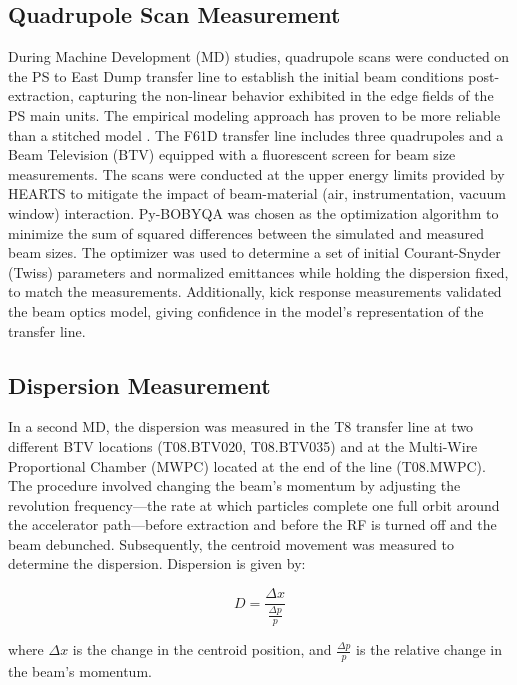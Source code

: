 \documentclass[a4paper,
               biblatex,     %
               ]{jacow}
\begin{document}
\subsection{Quadrupole Scan Measurement}

During Machine Development (MD) studies, quadrupole scans were conducted on the PS to East Dump transfer line to establish the initial beam conditions post-extraction, capturing the non-linear behavior exhibited in the edge fields of the PS main units. The empirical modeling approach has proven to be more reliable than a stitched model \cite{johnson_beam_2022}. The F61D transfer line includes three quadrupoles and a Beam Television (BTV) equipped with a fluorescent screen for beam size measurements. The scans were conducted at the upper energy limits provided by HEARTS to mitigate the impact of beam-material (air, instrumentation, vacuum window) interaction. Py-BOBYQA \cite{cartis_escaping_2022, cartis_improving_2019} was chosen as the optimization algorithm to minimize the sum of squared differences between the simulated and measured beam sizes. The optimizer was used to determine a set of initial Courant-Snyder (Twiss) parameters and normalized emittances while holding the dispersion fixed, to match the measurements. Additionally, kick response measurements validated the beam optics model, giving confidence in the model's representation of the transfer line.



\subsection{Dispersion Measurement}

In a second MD, the dispersion was measured in the T8 transfer line at two different BTV locations (T08.BTV020, T08.BTV035) and at the Multi-Wire Proportional Chamber (MWPC) located at the end of the line (T08.MWPC). The procedure involved changing the beam's momentum by adjusting the revolution frequency—the rate at which particles complete one full orbit around the accelerator path—before extraction and before the RF is turned off and the beam debunched. Subsequently, the centroid movement was measured to determine the dispersion. Dispersion is given by:

\begin{equation}
D = \frac{\Delta x}{\frac{\Delta p}{p}}
\end{equation}

\noindent where $\Delta x$ is the change in the centroid position, and $\frac{\Delta p}{p}$ is the relative change in the beam's momentum.
\end{document}
